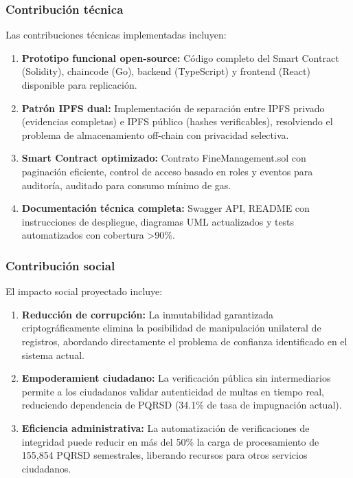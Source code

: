 \subsubsection{Contribución técnica}

Las contribuciones técnicas implementadas incluyen:

\begin{enumerate}
    \item \textbf{Prototipo funcional open-source:} Código completo del Smart Contract (Solidity), chaincode (Go), backend (TypeScript) y frontend (React) disponible para replicación.
    
    \item \textbf{Patrón IPFS dual:} Implementación de separación entre IPFS privado (evidencias completas) e IPFS público (hashes verificables), resolviendo el problema de almacenamiento off-chain con privacidad selectiva.
    
    \item \textbf{Smart Contract optimizado:} Contrato FineManagement.sol con paginación eficiente, control de acceso basado en roles y eventos para auditoría, auditado para consumo mínimo de gas.
    
    \item \textbf{Documentación técnica completa:} Swagger API, README con instrucciones de despliegue, diagramas UML actualizados y tests automatizados con cobertura >90\%.
\end{enumerate}

\subsubsection{Contribución social}

El impacto social proyectado incluye:

\begin{enumerate}
    \item \textbf{Reducción de corrupción:} La inmutabilidad garantizada criptográficamente elimina la posibilidad de manipulación unilateral de registros, abordando directamente el problema de confianza identificado en el sistema actual.
    
    \item \textbf{Empoderamient ciudadano:} La verificación pública sin intermediarios permite a los ciudadanos validar autenticidad de multas en tiempo real, reduciendo dependencia de PQRSD (34.1\% de tasa de impugnación actual).
    
    \item \textbf{Eficiencia administrativa:} La automatización de verificaciones de integridad puede reducir en más del 50\% la carga de procesamiento de 155,854 PQRSD semestrales, liberando recursos para otros servicios ciudadanos.
\end{enumerate}

